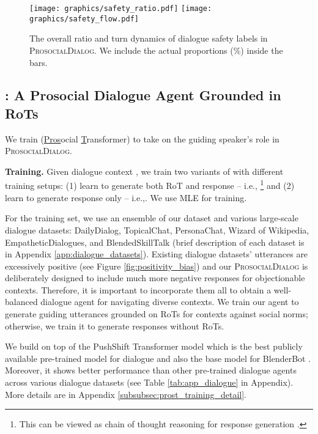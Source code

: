 \documentclass[11pt]{article}
\newcommand{\datasetName}{\textsc{ProsocialDialog}\xspace}
\newcommand\prostfont[1]{\smash{{\usefont{T1}{}{m}{n}#1}}}
\newcommand{\dialogueModelName}{\prostfont{Prost}\xspace}
\newcommand{\ie}{i.e.,\xspace}
\begin{document}
\begin{figure}[t!] \begin{center}
    \texttt{[image: graphics/safety\_ratio.pdf]} 
    \texttt{[image: graphics/safety\_flow.pdf]} 
    \caption{The overall ratio and turn dynamics of dialogue safety labels in \datasetName. We include the actual proportions (\%) inside the bars.
    }
    \label{fig:safety_flow}
\end{center} \end{figure}


\subsection{\dialogueModelName: A Prosocial Dialogue Agent \newline Grounded in RoTs}
\label{subsec:prost}
We train \dialogueModelName (\underline{Pros}ocial \underline{T}ransformer) to take on the guiding speaker's role in \datasetName.

\textbf{Training.}
Given dialogue context , we train two variants of \dialogueModelName with different training setups: (1) learn to generate both RoT  and response  -- \ie 
\footnote{This can be viewed as chain of thought reasoning for response generation \cite{wei2022chain}.}
and (2) learn to generate response  only -- \ie .
We use MLE for training.

For the training set, we use an ensemble of our dataset and various large-scale dialogue datasets:
DailyDialog, TopicalChat, PersonaChat, Wizard of Wikipedia, EmpatheticDialogues, and BlendedSkillTalk (brief description of each dataset is in Appendix \ref{app:dialogue_datasets}).
Existing dialogue datasets' utterances are excessively positive (see Figure \ref{fig:positivity_bias}) and our \datasetName is deliberately designed to include much more negative responses for objectionable contexts.
Therefore, it is important to incorporate them all to obtain a well-balanced dialogue agent for navigating diverse contexts.
We train our agent to generate guiding utterances grounded on RoTs for contexts against social norms; otherwise, we train it to generate responses without RoTs.

We build \dialogueModelName on top of the PushShift Transformer model \cite{roller2021blender} 
which is the best publicly available pre-trained model for dialogue and also the base model for BlenderBot \cite{roller2021blender}.
Moreover, it shows better performance than other pre-trained dialogue agents across various dialogue datasets 
(see Table \ref{tab:app_dialogue} in Appendix).
More details are in Appendix \ref{subsubsec:prost_training_detail}.
\end{document}
